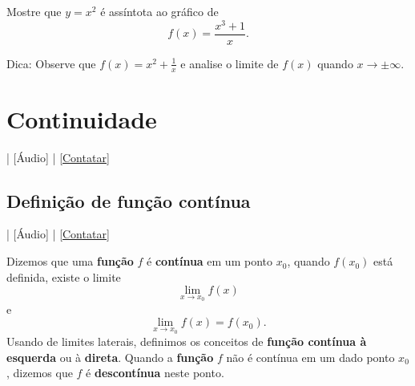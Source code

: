 \begin{exer}
  Mostre que $y = x^2$ é assíntota ao gráfico de
  \begin{equation}
    f(x) = \frac{x^3+1}{x}.
  \end{equation}
\end{exer}
\begin{resp}
  Dica: Observe que $f(x) = x^2 + \frac{1}{x}$ e analise o limite de $f(x)$ quando $x\to\pm\infty$.
\end{resp}


\section{Continuidade}\label{cap_lim_sec_cont}

\begin{flushright}
  [Vídeo] | [Áudio] | \href{https://phkonzen.github.io/notas/contato.html}{[Contatar]}
\end{flushright}

\subsection{Definição de função contínua}

\begin{flushright}
  [Vídeo] | [Áudio] | \href{https://phkonzen.github.io/notas/contato.html}{[Contatar]}
\end{flushright}

Dizemos que uma {\bf função} $f$ é {\bf contínua} em um ponto $x_0$, quando $f(x_0)$ está definida, existe o limite
\begin{equation}
  \lim_{x\to x_0} f(x)
\end{equation}
e
\begin{equation}
  \lim_{x\to x_0} f(x) = f(x_0).
\end{equation}
Usando de limites laterais, definimos os conceitos de {\bf função contínua à esquerda} ou à {\bf direta}. Quando a {\bf função} $f$ não é contínua em um dado ponto $x_0$, dizemos que $f$ é {\bf descontínua} neste ponto.

